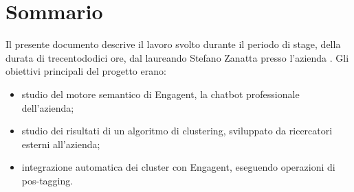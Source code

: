 
\cleardoublepage
{}
{}
\begingroup
\let\clearpage\relax
\let\cleardoublepage\relax
\let\cleardoublepage\relax

\chapter*{Sommario}

Il presente documento descrive il lavoro svolto durante il periodo di stage, della durata di trecentododici ore, dal laureando Stefano Zanatta presso l'azienda {\company{}}. Gli obiettivi principali del progetto erano:
\begin{itemize}
    \item studio del motore semantico di Engagent, la chatbot professionale dell'azienda;
    \item studio dei risultati di un algoritmo di clustering, sviluppato da ricercatori esterni all'azienda;
    \item integrazione automatica dei cluster con Engagent, eseguendo operazioni di pos-tagging.
\end{itemize}

%
%

\endgroup			

\vfill

